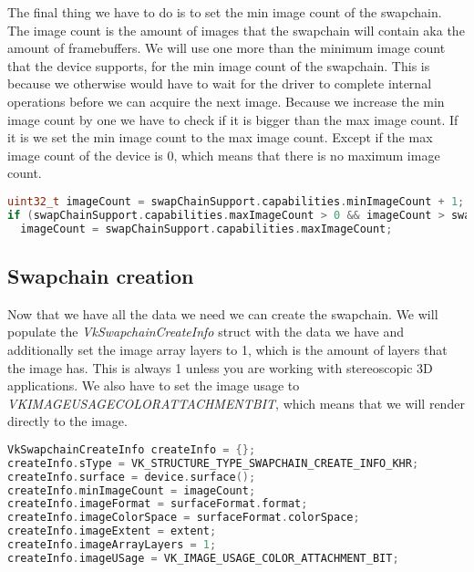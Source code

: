 \documentclass[12pt]{report} \usepackage{preamble}
\begin{document}
The final thing we have to do is to set the min image count of the swapchain. The image count is the amount
of images that the swapchain will contain aka the amount of framebuffers. We will use one more than the
minimum image count that the device supports, for the min image count of the swapchain. This is because
we otherwise would have to wait for the driver to complete internal operations before we can acquire the
next image. Because we increase the min image count
by one we have to check if it is bigger than the max image count. If it is we set the min image count to the
max image count. Except if the max image count of the device is 0, which means that there is no maximum image count.

\begin{lstlisting}[language=C++]
uint32_t imageCount = swapChainSupport.capabilities.minImageCount + 1;
if (swapChainSupport.capabilities.maxImageCount > 0 && imageCount > swapChainSupport.capabilities.maxImageCount)
  imageCount = swapChainSupport.capabilities.maxImageCount;
\end{lstlisting}

\subsection{Swapchain creation}

Now that we have all the data we need we can create the swapchain. We will populate the
\textit{VkSwapchainCreateInfo} struct with the data we have and additionally set the
image array layers to 1, which is the amount of layers that the image has. This is always
1 unless you are working with stereoscopic 3D applications. We also have to set the image
usage to
\textit{VK\textunderscore IMAGE\textunderscore USAGE\textunderscore COLOR\textunderscore ATTACHMENT\textunderscore BIT},
which means that we will render directly to the image.

\begin{lstlisting}[language=C++]
VkSwapchainCreateInfo createInfo = {};
createInfo.sType = VK_STRUCTURE_TYPE_SWAPCHAIN_CREATE_INFO_KHR;
createInfo.surface = device.surface();
createInfo.minImageCount = imageCount;
createInfo.imageFormat = surfaceFormat.format;
createInfo.imageColorSpace = surfaceFormat.colorSpace;
createInfo.imageExtent = extent;
createInfo.imageArrayLayers = 1;
createInfo.imageUSage = VK_IMAGE_USAGE_COLOR_ATTACHMENT_BIT;
\end{lstlisting}
\end{document}
